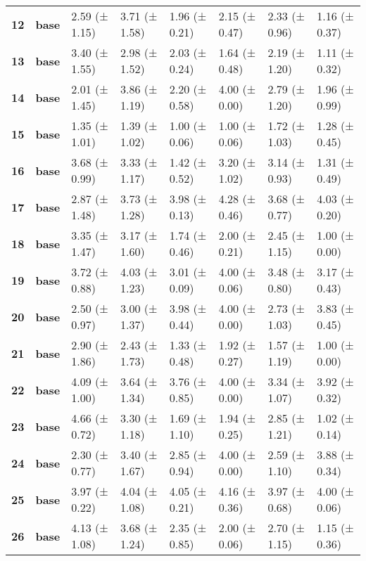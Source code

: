 \begin{longtable}{llllllll}
\cline{1-8}
\textbf{12} & \textbf{base} & 2.59 (± 1.15) & 3.71 (± 1.58) & 1.96 (± 0.21) & 2.15 (± 0.47) & 2.33 (± 0.96) & 1.16 (± 0.37) \\
\cline{1-8}
\textbf{13} & \textbf{base} & 3.40 (± 1.55) & 2.98 (± 1.52) & 2.03 (± 0.24) & 1.64 (± 0.48) & 2.19 (± 1.20) & 1.11 (± 0.32) \\
\cline{1-8}
\textbf{14} & \textbf{base} & 2.01 (± 1.45) & 3.86 (± 1.19) & 2.20 (± 0.58) & 4.00 (± 0.00) & 2.79 (± 1.20) & 1.96 (± 0.99) \\
\cline{1-8}
\textbf{15} & \textbf{base} & 1.35 (± 1.01) & 1.39 (± 1.02) & 1.00 (± 0.06) & 1.00 (± 0.06) & 1.72 (± 1.03) & 1.28 (± 0.45) \\
\cline{1-8}
\textbf{16} & \textbf{base} & 3.68 (± 0.99) & 3.33 (± 1.17) & 1.42 (± 0.52) & 3.20 (± 1.02) & 3.14 (± 0.93) & 1.31 (± 0.49) \\
\cline{1-8}
\textbf{17} & \textbf{base} & 2.87 (± 1.48) & 3.73 (± 1.28) & 3.98 (± 0.13) & 4.28 (± 0.46) & 3.68 (± 0.77) & 4.03 (± 0.20) \\
\cline{1-8}
\textbf{18} & \textbf{base} & 3.35 (± 1.47) & 3.17 (± 1.60) & 1.74 (± 0.46) & 2.00 (± 0.21) & 2.45 (± 1.15) & 1.00 (± 0.00) \\
\cline{1-8}
\textbf{19} & \textbf{base} & 3.72 (± 0.88) & 4.03 (± 1.23) & 3.01 (± 0.09) & 4.00 (± 0.06) & 3.48 (± 0.80) & 3.17 (± 0.43) \\
\cline{1-8}
\textbf{20} & \textbf{base} & 2.50 (± 0.97) & 3.00 (± 1.37) & 3.98 (± 0.44) & 4.00 (± 0.00) & 2.73 (± 1.03) & 3.83 (± 0.45) \\
\cline{1-8}
\textbf{21} & \textbf{base} & 2.90 (± 1.86) & 2.43 (± 1.73) & 1.33 (± 0.48) & 1.92 (± 0.27) & 1.57 (± 1.19) & 1.00 (± 0.00) \\
\cline{1-8}
\textbf{22} & \textbf{base} & 4.09 (± 1.00) & 3.64 (± 1.34) & 3.76 (± 0.85) & 4.00 (± 0.00) & 3.34 (± 1.07) & 3.92 (± 0.32) \\
\cline{1-8}
\textbf{23} & \textbf{base} & 4.66 (± 0.72) & 3.30 (± 1.18) & 1.69 (± 1.10) & 1.94 (± 0.25) & 2.85 (± 1.21) & 1.02 (± 0.14) \\
\cline{1-8}
\textbf{24} & \textbf{base} & 2.30 (± 0.77) & 3.40 (± 1.67) & 2.85 (± 0.94) & 4.00 (± 0.00) & 2.59 (± 1.10) & 3.88 (± 0.34) \\
\cline{1-8}
\textbf{25} & \textbf{base} & 3.97 (± 0.22) & 4.04 (± 1.08) & 4.05 (± 0.21) & 4.16 (± 0.36) & 3.97 (± 0.68) & 4.00 (± 0.06) \\
\cline{1-8}
\textbf{26} & \textbf{base} & 4.13 (± 1.08) & 3.68 (± 1.24) & 2.35 (± 0.85) & 2.00 (± 0.06) & 2.70 (± 1.15) & 1.15 (± 0.36) \\

\end{longtable}

